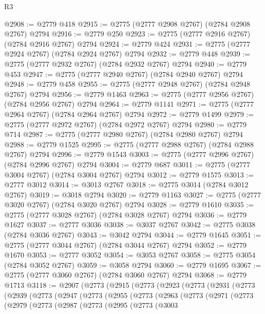 \begin{lexlean}{R3}
\begin{coremodule}
@2908 := @2779 @418
@2915 := @2775 (@2777 @2908 @2767) (@2784 @2908 @2767) @2794
@2916 := @2779 @250
@2923 := @2775 (@2777 @2916 @2767) (@2784 @2916 @2767) @2794
@2924 := @2779 @424
@2931 := @2775 (@2777 @2924 @2767) (@2784 @2924 @2767) @2794
@2932 := @2779 @448
@2939 := @2775 (@2777 @2932 @2767) (@2784 @2932 @2767) @2794
@2940 := @2779 @453
@2947 := @2775 (@2777 @2940 @2767) (@2784 @2940 @2767) @2794
@2948 := @2779 @458
@2955 := @2775 (@2777 @2948 @2767) (@2784 @2948 @2767) @2794
@2956 := @2779 @1463
@2963 := @2775 (@2777 @2956 @2767) (@2784 @2956 @2767) @2794
@2964 := @2779 @1141
@2971 := @2775 (@2777 @2964 @2767) (@2784 @2964 @2767) @2794
@2972 := @2779 @1499
@2979 := @2775 (@2777 @2972 @2767) (@2784 @2972 @2767) @2794
@2980 := @2779 @714
@2987 := @2775 (@2777 @2980 @2767) (@2784 @2980 @2767) @2794
@2988 := @2779 @1525
@2995 := @2775 (@2777 @2988 @2767) (@2784 @2988 @2767) @2794
@2996 := @2779 @1543
@3003 := @2775 (@2777 @2996 @2767) (@2784 @2996 @2767) @2794
@3004 := @2779 @687
@3011 := @2775 (@2777 @3004 @2767) (@2784 @3004 @2767) @2794
@3012 := @2779 @1575
@3013 := @2777 @3012
@3014 := @3013 @2767
@3018 := @2775 @3014 (@2784 @3012 @2767)
@3019 := @3018 @2794
@3020 := @2779 @1163
@3027 := @2775 (@2777 @3020 @2767) (@2784 @3020 @2767) @2794
@3028 := @2779 @1610
@3035 := @2775 (@2777 @3028 @2767) (@2784 @3028 @2767) @2794
@3036 := @2779 @1627
@3037 := @2777 @3036
@3038 := @3037 @2767
@3042 := @2775 @3038 (@2784 @3036 @2767)
@3043 := @3042 @2794
@3044 := @2779 @1645
@3051 := @2775 (@2777 @3044 @2767) (@2784 @3044 @2767) @2794
@3052 := @2779 @1670
@3053 := @2777 @3052
@3054 := @3053 @2767
@3058 := @2775 @3054 (@2784 @3052 @2767)
@3059 := @3058 @2794
@3060 := @2779 @1695
@3067 := @2775 (@2777 @3060 @2767) (@2784 @3060 @2767) @2794
@3068 := @2779 @1713
@3118 := @2907
    (@2773
      (@2915
        (@2773
          (@2923
            (@2773
              (@2931
                (@2773
                  (@2939
                    (@2773
                      (@2947
                        (@2773
                          (@2955
                            (@2773
                              (@2963
                                (@2773
                                  (@2971
                                    (@2773
                                      (@2979
                                        (@2773
                                          (@2987
                                            (@2773
                                              (@2995
                                                (@2773
                                                  (@3003

\end{coremodule}
\end{lexlean}
